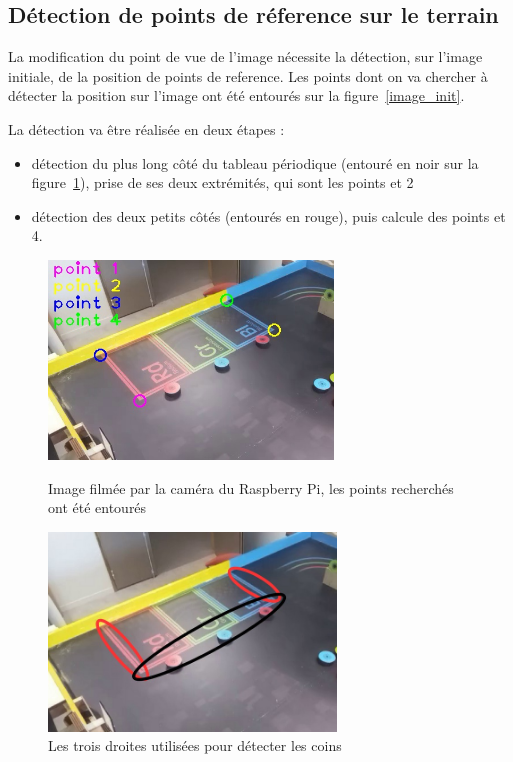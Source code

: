 \documentclass{article}
\begin{document}
\subsection{Détection de points de réference sur le terrain}
La modification du point de vue de l'image nécessite la détection, sur l'image initiale, de la position de points de reference. Les points dont on va chercher à 
détecter la position sur l'image ont été entourés sur la figure~\ref{image_init}.

La détection va être réalisée en deux étapes :
\begin{itemize}
\item détection du plus long côté du tableau périodique (entouré en noir sur la figure~\ref{3droites}), prise de ses deux extrémités, qui sont les points  et 2
\item détection des deux petits côtés (entourés en rouge), puis calcule des points  et 4.
\end{itemize}

\begin{figure}[!h]
   \begin{minipage}[t]{.46\linewidth}
      \begin{center}
      \includegraphics[height=150pt]{image_4_points.jpg}
      \end{center}
      \caption{Image filmée par la caméra du Raspberry Pi, les points recherchés ont été entourés}
      \label{image_init}
   \end{minipage} \hfill
   \begin{minipage}[t]{.46\linewidth}
      \begin{center}
      \includegraphics[height=150pt]{image_3_droites.jpg}
      \end{center}
      \caption{Les trois droites utilisées pour détecter les coins}
      \label{3droites}
   \end{minipage}
\end{figure}
\end{document}
